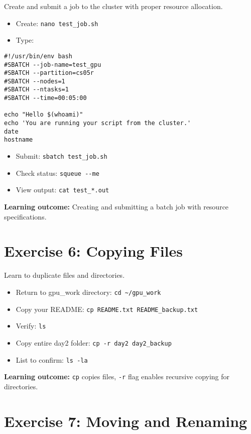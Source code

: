 \documentclass[11pt, a4paper]{article}
\newcommand{\code}[1]{\texttt{#1}}
\begin{document}
Create and submit a job to the cluster with proper resource allocation.

\begin{itemize}
    \item Create: \code{nano test\_job.sh}
    \item Type:
\end{itemize}

\begin{lstlisting}
#!/usr/bin/env bash
#SBATCH --job-name=test_gpu
#SBATCH --partition=cs05r
#SBATCH --nodes=1
#SBATCH --ntasks=1
#SBATCH --time=00:05:00

echo "Hello $(whoami)"
echo 'You are running your script from the cluster.'
date
hostname
\end{lstlisting}

\begin{itemize}
    \item Submit: \code{sbatch test\_job.sh}
    \item Check status: \code{squeue -{}-me}
    \item View output: \code{cat test\_*.out}
\end{itemize}

\textbf{Learning outcome:} Creating and submitting a batch job with resource specifications.

\section*{Exercise 6: Copying Files}

Learn to duplicate files and directories.

\begin{itemize}
    \item Return to gpu\_work directory: \code{cd \textasciitilde/gpu\_work}
    \item Copy your README: \code{cp README.txt README\_backup.txt}
    \item Verify: \code{ls}
    \item Copy entire day2 folder: \code{cp -r day2 day2\_backup}
    \item List to confirm: \code{ls -la}
\end{itemize}

\textbf{Learning outcome:} \code{cp} copies files, \code{-r} flag enables recursive copying for directories.

\section*{Exercise 7: Moving and Renaming}
\end{document}

